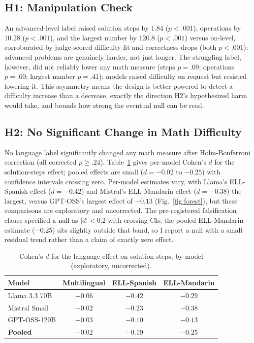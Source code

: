 \documentclass[runningheads]{llncs}
\begin{document}
\subsection{H1: Manipulation Check}

An advanced-level label raised solution steps by 1.84 ($p<.001$), operations by 10.28 ($p<.001$), and the largest number by 120.8 ($p<.001$) versus on-level, corroborated by judge-scored difficulty fit and correctness drops (both $p<.001$): advanced problems are genuinely harder, not just longer. The struggling label, however, did not reliably lower any math measure (steps $p=.09$; operations $p=.60$; largest number $p=.41$): models raised difficulty on request but resisted lowering it. This asymmetry means the design is better powered to detect a difficulty increase than a decrease, exactly the direction H2's hypothesized harm would take, and bounds how strong the eventual null can be read.

\subsection{H2: No Significant Change in Math Difficulty}

No language label significantly changed any math measure after Holm-Bonferroni correction (all corrected $p \geq .24$). Table~\ref{tab:permodel} gives per-model Cohen's $d$ for the solution-steps effect; pooled effects are small ($d=-0.02$ to $-0.25$) with confidence intervals crossing zero. Per-model estimates vary, with Llama's ELL-Spanish effect ($d=-0.42$) and Mistral's ELL-Mandarin effect ($d=-0.38$) the largest, versus GPT-OSS's largest effect of $-0.13$ (Fig.~\ref{fig:forest}), but these comparisons are exploratory and uncorrected. The pre-registered falsification clause specified a null as $|d|<0.2$ with crossing CIs; the pooled ELL-Mandarin estimate ($-0.25$) sits slightly outside that band, so I report a null with a small residual trend rather than a claim of exactly zero effect.

\begin{table}[t]
\caption{Cohen's $d$ for the language effect on solution steps, by model (exploratory, uncorrected).}
\label{tab:permodel}
\centering\small
\begin{tabular}{lccc}
\hline
Model & Multilingual & ELL-Spanish & ELL-Mandarin \\
\hline
Llama 3.3 70B & $-0.06$ & $-0.42$ & $-0.29$ \\
Mistral Small & $-0.02$ & $-0.23$ & $-0.38$ \\
GPT-OSS-120B & $-0.03$ & $-0.10$ & $-0.13$ \\
\textbf{Pooled} & $-0.02$ & $-0.19$ & $-0.25$ \\
\hline
\end{tabular}
\end{table}
\end{document}
